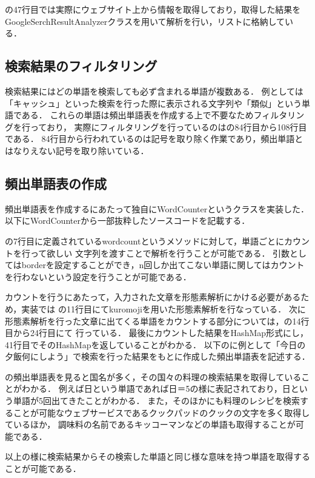 の47行目では実際にウェブサイト上から情報を取得しており，取得した結果を
GoogleSerchResultAnalyzerクラスを用いて解析を行い，リストに格納している．

\subsection{検索結果のフィルタリング}
検索結果にはどの単語を検索しても必ず含まれる単語が複数ある．
例としては「キャッシュ」といった検索を行った際に表示される文字列や「類似」という単語である．
これらの単語は頻出単語表を作成する上で不要なためフィルタリングを行っており，
実際にフィルタリングを行っているのはの84行目から108行目である．
84行目から行われているのは記号を取り除く作業であり，頻出単語とはなりえない記号を取り除いている．

\subsection{頻出単語表の作成}
頻出単語表を作成するにあたって独自にWordCounterというクラスを実装した．
以下にWordCounterから一部抜粋したソースコードを記載する．


の7行目に定義されているwordcountというメソッドに対して，単語ごとにカウントを行って欲しい
文字列を渡すことで解析を行うことが可能である．
引数としてはborderを設定することができ，n回しか出てこない単語に関してはカウントを行わないという設定を行うことが可能である．

カウントを行うにあたって，入力された文章を形態素解析にかける必要があるため，実装では
の11行目にてkuromojiを用いた形態素解析を行なっている．
次に形態素解析を行った文章に出てくる単語をカウントする部分については，の14行目から24行目にて
行っている．
最後にカウントした結果をHashMap形式にし，41行目でそのHashMapを返していることがわかる．
以下のに例として「今日の夕飯何にしよう」で検索を行った結果をもとに作成した頻出単語表を記述する．


の頻出単語表を見ると国名が多く，その国々の料理の検索結果を取得していることがわかる．
例えば日という単語であれば日＝5の様に表記されており，日という単語が5回出てきたことがわかる．
また，そのほかにも料理のレシピを検索することが可能なウェブサービスであるクックパッドのクックの文字を多く取得しているほか，
調味料の名前であるキッコーマンなどの単語も取得することが可能である．

以上の様に検索結果からその検索した単語と同じ様な意味を持つ単語を取得することが可能である．

